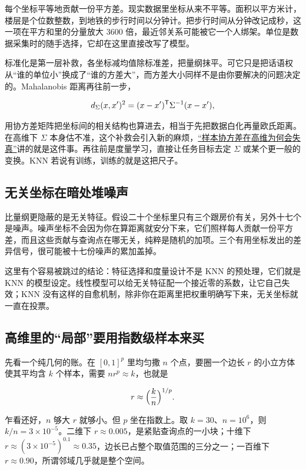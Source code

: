 每个坐标平等地贡献一份平方差。现实数据里坐标从来不平等。面积以平方米计，楼层是个位数整数，到地铁的步行时间以分钟计。把步行时间从分钟改记成秒，这一项在平方和里的分量放大 3600 倍，最近邻关系可能被它一个人绑架。单位是数据采集时的随手选择，它却在这里直接改写了模型。

标准化是第一层补救，各坐标减均值除标准差，把量纲抹平。可它只是把话语权从``谁的单位小''换成了``谁的方差大''，而方差大小同样不是由你要解决的问题决定的。Mahalanobis 距离再往前一步，

\[
d_\Sigma(x,x')^2=(x-x')^{\mathsf{T}}\Sigma^{-1}(x-x') ,
\]

用协方差矩阵把坐标间的相关结构也算进去，相当于先把数据白化再量欧氏距离。在高维下 \(\Sigma\) 本身估不准，这个补救会引入新的麻烦，\hyperref[sec:11-Mathematical-Statistics/09-Random-Matrix-Theory/01]{``样本协方差在高维为何会失真''}讲的就是这件事。再往前是度量学习，直接让任务目标去定 \(\Sigma\) 或某个更一般的变换。KNN 若说有训练，训练的就是这把尺子。

\subsection{无关坐标在暗处堆噪声}

比量纲更隐蔽的是无关特征。假设二十个坐标里只有三个跟房价有关，另外十七个是噪声。噪声坐标不会因为你在算距离就安分下来，它们照样每人贡献一份平方差，而且这些贡献与查询点在哪无关，纯粹是随机的加项。三个有用坐标发出的差异信号，很可能被十七份噪声的累加盖掉。

这里有个容易被跳过的结论：特征选择和度量设计不是 KNN 的预处理，它们就是 KNN 的模型设定。线性模型可以给无关特征配一个接近零的系数，让它自己失效；KNN 没有这样的自愈机制，除非你在距离里把权重明确写下来，无关坐标就一直在投票。

\subsection{高维里的``局部''要用指数级样本来买}

先看一个纯几何的账。在 \([0,1]^p\) 里均匀撒 \(n\) 个点，要圈一个边长 \(r\) 的小立方体使其平均含 \(k\) 个样本，需要 \(nr^p\approx k\)，也就是

\[
r\approx\Bigl(\frac{k}{n}\Bigr)^{1/p}.
\]

乍看还好，\(n\) 够大 \(r\) 就够小。但 \(p\) 坐在指数上。取 \(k=30\)、\(n=10^6\)，则 \(k/n=3\times10^{-5}\)。二维下 \(r\approx 0.005\)，是紧贴查询点的一小块；十维下 \(r\approx (3\times10^{-5})^{0.1}\approx 0.35\)，边长已占整个取值范围的三分之一；一百维下 \(r\approx 0.90\)，所谓邻域几乎就是整个空间。

